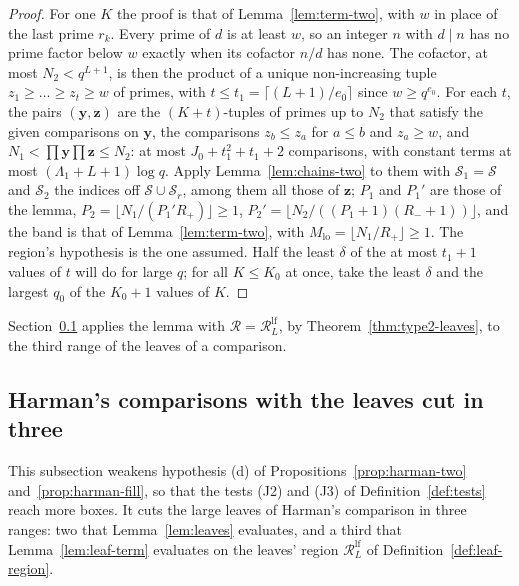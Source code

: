 \documentclass[11pt]{article}
\theoremstyle{definition}
\begin{document}
\begin{proof}
For one $K$ the proof is that of Lemma~\ref{lem:term-two}, with $w$ in place of the last prime $r_k$. Every prime of $d$
is at least $w$, so an integer $n$ with $d \mid n$ has no prime factor below $w$ exactly when its cofactor $n/d$ has
none. The cofactor, at most $N_2 < q^{L + 1}$, is then the product of a unique non-increasing tuple $z_1 \ge \dots \ge
z_t \ge w$ of primes, with $t \le t_1 = \lceil (L + 1)/e_0 \rceil$ since $w \ge q^{e_0}$. For each $t$, the pairs
$(\mathbf y, \mathbf z)$ are the $(K + t)$-tuples of primes up to $N_2$ that satisfy the given comparisons on $\mathbf
y$, the comparisons $z_b \le z_a$ for $a \le b$ and $z_a \ge w$, and $N_1 < \prod \mathbf y \prod \mathbf z \le N_2$: at
most $J_0 + t_1^2 + t_1 + 2$ comparisons, with constant terms at most $(\Lambda_1 + L + 1)\log q$. Apply
Lemma~\ref{lem:chains-two} to them with $\mathcal S_1 = \mathcal S$ and $\mathcal S_2$ the indices
off $\mathcal S \cup \mathcal S_r$, among them all those of $\mathbf z$; $P_1$ and $P_1'$ are those of the lemma, $P_2 =
\lfloor N_1/(P_1'R_+) \rfloor \ge 1$, $P_2' = \lfloor N_2/((P_1 + 1)(R_- + 1)) \rfloor$, and the band is that of
Lemma~\ref{lem:term-two}, with $M_{\mathrm{lo}} = \lfloor N_1/R_+ \rfloor \ge 1$. The region's hypothesis is the one
assumed. Half the least $\delta$ of the at most $t_1 + 1$ values of $t$ will do for large $q$; for all $K \le K_0$ at
once, take the least $\delta$ and the largest $q_0$ of the $K_0 + 1$ values of $K$.
\end{proof}

Section~\ref{sec:leaves-three} applies the lemma with $\mathcal R = \mathcal R^{\mathrm{lf}}_L$, by
Theorem~\ref{thm:type2-leaves}, to the third range of the leaves of a comparison.

\subsection{Harman's comparisons with the leaves cut in three}\label{sec:leaves-three}

This subsection weakens hypothesis (d) of Propositions~\ref{prop:harman-two} and~\ref{prop:harman-fill}, so that the
tests (J2) and (J3) of Definition~\ref{def:tests} reach more boxes. It cuts the large leaves of Harman's comparison in
three ranges: two that Lemma~\ref{lem:leaves} evaluates, and a third that Lemma~\ref{lem:leaf-term} evaluates on the
leaves' region $\mathcal R^{\mathrm{lf}}_L$ of Definition~\ref{def:leaf-region}.
\end{document}
